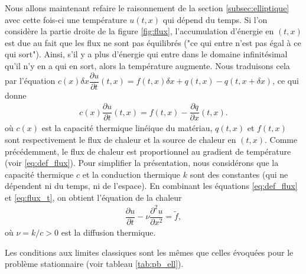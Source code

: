 \documentclass[12pt,a4paper,twoside]{article}
\begin{document}
Nous allons maintenant refaire le raisonnement de la section \ref{subsec:elliptique}
avec cette fois-ci une temp\'erature $u(t,x)$ qui d\'epend du temps.
Si l'on consid\`ere la partie droite de la figure \ref{fig:flux}, l'accumulation
d'\'energie en $(t,x)$ est due au fait que les flux ne sont pas \'equilibr\'es
("ce qui entre n'est pas \'egal \`a ce qui sort").
Ainsi, s'il y a plus d'\'energie qui entre dans le domaine infinit\'esimal
qu'il n'y en a qui en sort,
alors la temp\'erature augmente.
Nous traduisons cela par l'\'equation
$c (x) \delta x \dfrac{\partial u}{\partial t}(t,x) = f(t,x) \delta x 
  + q(t,x) - q(t,x + \delta x)$, ce qui donne
\begin{align}
  \label{eq:flux_t}
  c (x) \dfrac{\partial u}{\partial t}(t,x) = f(t,x) - \dfrac{\partial q}{\partial x} (t,x) .
\end{align}
o\`u $c(x)$ est la capacit\'e thermique lin\'eique du mat\'eriau,
$q(t,x)$ et $f(t,x)$ sont respectivement le flux de chaleur 
et la source de chaleur en $(t,x)$.
Comme pr\'ec\'edemment, le flux de chaleur est proportionnel au gradient 
de temp\'erature (voir \eqref{eq:def_flux}).
Pour simplifier la pr\'esentation, nous consid\'erons que la capacit\'e
thermique $c$ et la conduction thermique $k$ sont des constantes 
(qui ne d\'ependent ni du temps, ni de l'espace).
En combinant les \'equations \eqref{eq:def_flux} et \eqref{eq:flux_t},
on obtient l'\'equation de la chaleur
\begin{align}
  \label{eq:chaleur}
  \dfrac{\partial u}{\partial t} - \nu \dfrac{\partial^2 u}{\partial x^2} = \widetilde{f} ,
\end{align}
o\`u $\nu = k/c > 0$ est la diffusion thermique.



Les conditions aux limites classiques sont les m\^emes que celles \'evoqu\'ees pour le probl\`eme
stationnaire (voir tableau \ref{tab:pb_ell}).
\end{document}
